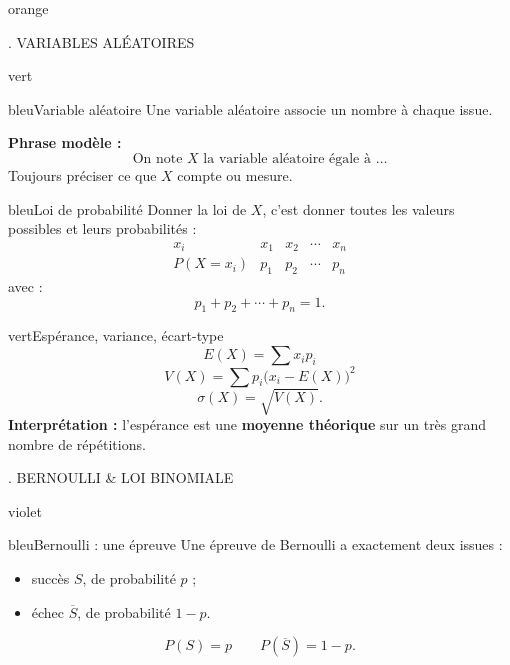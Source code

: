 \documentclass[11pt,a4paper]{article}
\newcommand{\tagcol}[2]{%
\begin{tcolorbox}[
    enhanced,
    colback=#1!11,
    colframe=#1!45!black,
    boxrule=0.42pt,
    arc=2mm,
    left=1mm,right=1mm,top=0.45mm,bottom=0.45mm,
    before skip=0mm,
    after skip=0.85mm,
    fontupper=\bfseries\scriptsize,
    colupper=#1!55!black
]
\centering #2
\end{tcolorbox}}
\begin{document}
\begin{landscape}
\begin{minipage}[t]{0.242\linewidth}
\begin{panel}{orange}
\end{panel}
\end{minipage}
\hfill
\begin{minipage}[t]{0.242\linewidth}
\tagcol{vert}{3. VARIABLES ALÉATOIRES}
\begin{panel}{vert}

\begin{fichebox}{bleu}{Variable aléatoire}
Une variable aléatoire associe un nombre à chaque issue.

\medskip
\textbf{Phrase modèle :}
\[
\text{On note }X\text{ la variable aléatoire égale à }\ldots
\]
Toujours préciser ce que $X$ compte ou mesure.
\end{fichebox}

\begin{fichebox}{bleu}{Loi de probabilité}
Donner la loi de $X$, c'est donner toutes les valeurs possibles et leurs probabilités :
\[
\begin{array}{c|cccc}
x_i & x_1 & x_2 & \cdots & x_n\\
\hline
P(X=x_i)&p_1&p_2&\cdots&p_n
\end{array}
\]
avec :
\[
p_1+p_2+\cdots+p_n=1.
\]
\end{fichebox}

\begin{fichebox}{vert}{Espérance, variance, écart-type}
\[
E(X)=\sum x_i p_i
\]
\[
V(X)=\sum p_i\bigl(x_i-E(X)\bigr)^2
\]
\[
\sigma(X)=\sqrt{V(X)}.
\]
\textbf{Interprétation :} l'espérance est une \textbf{moyenne théorique} sur un très grand nombre de répétitions.
\end{fichebox}

\end{panel}
\end{minipage}
\hfill
\begin{minipage}[t]{0.242\linewidth}
\tagcol{violet}{4. BERNOULLI \& LOI BINOMIALE}
\begin{panel}{violet}

\begin{fichebox}{bleu}{Bernoulli : une épreuve}
Une épreuve de Bernoulli a exactement deux issues :
\begin{itemize}
    \item succès $S$, de probabilité $p$ ;
    \item échec $\overline S$, de probabilité $1-p$.
\end{itemize}
\[
P(S)=p \qquad P(\overline S)=1-p.
\]
\end{fichebox}


\end{panel}
\end{minipage}
\end{landscape}
\end{document}
